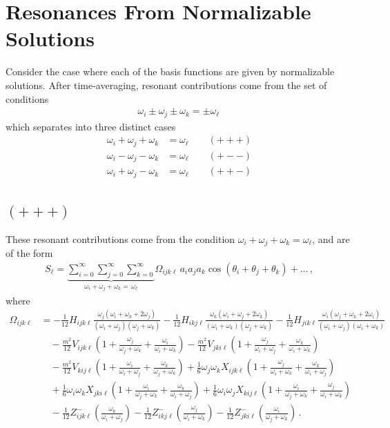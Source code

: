 \documentclass[letterpaper,11pt]{article}
\newcommand{\oi}{\omega_i}
\newcommand{\oj}{\omega_j}
\newcommand{\ok}{\omega_k}
\newcommand{\ol}{\omega_\ell}
\newcommand{\thi}{\theta_i}
\newcommand{\thj}{\theta_j}
\newcommand{\thk}{\theta_k}
\begin{document}

\section{Resonances From Normalizable Solutions}
\label{sec: norm res}
Consider the case where each of the basis functions are given by normalizable solutions. After time-averaging, resonant contributions come from the set of conditions
\begin{align}
\label{gen res}
\oi \pm \oj \pm \ok = \pm \ol \,
\end{align}
which separates into three distinct cases
\begin{align}
\oi + \oj + \ok &= \ol \qquad (+++) \\
\oi - \oj - \ok &= \ol \qquad (+--) \\
\oi + \oj - \ok &= \ol \qquad (++-)
\end{align}


\subsection{$(+++)$}

These resonant contributions come from the condition $\oi + \oj + \ok = \ol$, and are of the form
\begin{align}
S_\ell = \underbrace{\sum_{i=0}^\infty \sum_{j=0}^\infty \sum_{k=0}^\infty}_{\oi + \oj + \ok = \, \ol} \Omega_{ijk\ell} \, a_i a_j a_k \cos \left( \thi + \thj + \thk \right) + \ldots \, ,
\end{align}
where
\begin{align}
\label{omega}
\Omega_{ijk\ell} &= -\frac{1}{12}H_{ijk\ell} \frac{\oj (\oi + \ok +2\oj)}{(\oi + \oj)(\oj + \ok)} - \frac{1}{12} H_{ikj\ell} \frac{\ok (\oi + \oj + 2\ok)}{(\oi + \ok)(\oj + \ok)}- \frac{1}{12} H_{jik\ell} \frac{\oi (\oj + \ok +2\oi)}{(\oi + \oj)(\oi + \ok)} \nonumber \\
%
& \quad - \frac{m^2}{12} V_{ijk\ell} \left( 1 + \frac{\oj}{\oj + \ok} + \frac{\oi}{\oi + \ok} \right) - \frac{m^2}{12} V_{jki\ell} \left( 1 + \frac{\oj}{\oi + \oj} + \frac{\ok}{\oi + \ok} \right) \nonumber \\
%
& \quad - \frac{m^2}{12} V_{kij\ell} \left( 1 + \frac{\oi}{\oi + \oj} + \frac{\ok}{\oj + \ok} \right)  + \frac{1}{6} \oj \ok X_{ijk\ell} \left( 1 + \frac{\oj}{\oi + \ok} + \frac{\ok}{\oi + \oj} \right) \nonumber \\
%
& \quad + \frac{1}{6} \oi \ok X_{jki\ell} \left( 1 + \frac{\oi}{\oj + \ok} + \frac{\ok}{\oi + \oj} \right) + \frac{1}{6} \oi \oj X_{kij\ell} \left( 1 + \frac{\oi}{\oj + \ok} + \frac{\oj}{\oi + \ok} \right) \nonumber \\
%
& \quad - \frac{1}{12} Z^-_{ijk\ell} \left( \frac{\ok}{\oi + \oj} \right) - \frac{1}{12} Z^-_{ikj\ell} \left( \frac{\oj}{\oi + \ok} \right) - \frac{1}{12} Z^-_{jki\ell}  \left( \frac{\oi}{\oj + \ok} \right) \, .
\end{align}
\end{document}
